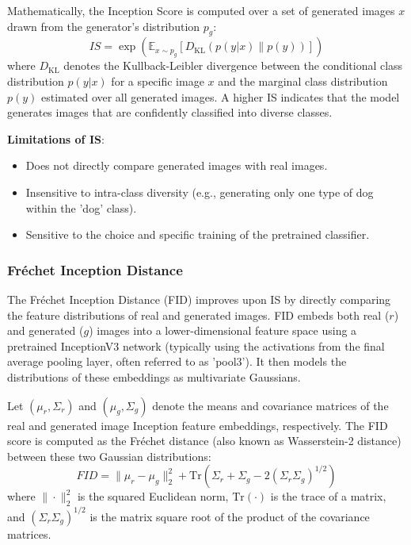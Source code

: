 \noindent 
Mathematically, the Inception Score is computed over a set of generated images \(x\) drawn from the generator's distribution \(p_g\):
\begin{equation}
IS = \exp \left( \mathbb{E}_{x \sim p_g} \left[ D_{\text{KL}}(p(y|x) \| p(y)) \right] \right)
\end{equation}
where \( D_{\text{KL}} \) denotes the Kullback-Leibler divergence between the conditional class distribution \(p(y|x)\) for a specific image \(x\) and the marginal class distribution \(p(y)\) estimated over all generated images. A higher IS indicates that the model generates images that are confidently classified into diverse classes.

\textbf{Limitations of IS}:
\begin{itemize}
    \item Does not directly compare generated images with real images.
    \item Insensitive to intra-class diversity (e.g., generating only one type of dog within the 'dog' class).
    \item Sensitive to the choice and specific training of the pretrained classifier.
\end{itemize}

\subsubsection[Fréchet Inception Distance - FID]{Fréchet Inception Distance}

The Fréchet Inception Distance (FID) \cite{heusel2018ganstrainedtimescaleupdate} improves upon IS by directly comparing the feature distributions of real and generated images. FID embeds both real (\(r\)) and generated (\(g\)) images into a lower-dimensional feature space using a pretrained InceptionV3 network (typically using the activations from the final average pooling layer, often referred to as 'pool3'). It then models the distributions of these embeddings as multivariate Gaussians.

Let \( (\mu_r, \Sigma_r) \) and \( (\mu_g, \Sigma_g) \) denote the means and covariance matrices of the real and generated image Inception feature embeddings, respectively. The FID score is computed as the Fréchet distance (also known as Wasserstein-2 distance) between these two Gaussian distributions:
\begin{equation}
FID = \| \mu_r - \mu_g \|^2_2 + \text{Tr} \left( \Sigma_r + \Sigma_g - 2(\Sigma_r \Sigma_g)^{1/2} \right)
\end{equation}
where \( \|\cdot\|^2_2 \) is the squared Euclidean norm, \( \text{Tr}(\cdot) \) is the trace of a matrix, and \( (\Sigma_r \Sigma_g)^{1/2} \) is the matrix square root of the product of the covariance matrices.

